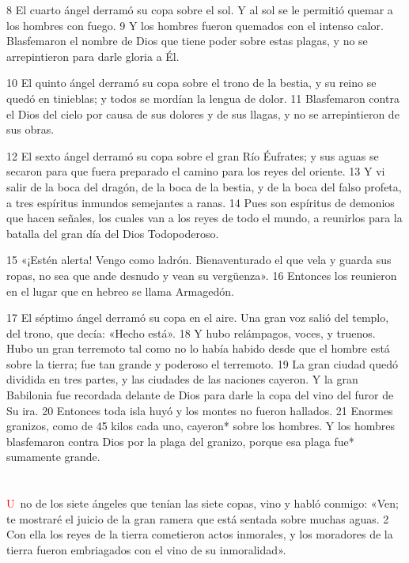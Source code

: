 \documentclass[12pt,twocolumn,twoside]{book}
\begin{document}
8 El cuarto ángel derramó su copa sobre el sol. Y al sol se le permitió quemar a los hombres con fuego. 9 Y los hombres fueron quemados con el intenso calor. Blasfemaron el nombre de Dios que tiene poder sobre estas plagas, y no se arrepintieron para darle gloria a Él.

10 El quinto ángel derramó su copa sobre el trono de la bestia, y su reino se quedó en tinieblas; y todos se mordían la lengua de dolor. 11 Blasfemaron contra el Dios del cielo por causa de sus dolores y de sus llagas, y no se arrepintieron de sus obras.

12 El sexto ángel derramó su copa sobre el gran Río Éufrates; y sus aguas se secaron para que fuera preparado el camino para los reyes del oriente. 13 Y vi salir de la boca del dragón, de la boca de la bestia, y de la boca del falso profeta, a tres espíritus inmundos semejantes a ranas. 14 Pues son espíritus de demonios que hacen señales, los cuales van a los reyes de todo el mundo, a reunirlos para la batalla del gran día del Dios Todopoderoso.

15 «¡Estén alerta! Vengo como ladrón. Bienaventurado el que vela y guarda sus ropas, no sea que ande desnudo y vean su vergüenza». 16 Entonces los reunieron en el lugar que en hebreo se llama Armagedón.

17 El séptimo ángel derramó su copa en el aire. Una gran voz salió del templo, del trono, que decía: «Hecho está». 18 Y hubo relámpagos, voces, y truenos. Hubo un gran terremoto tal como no lo había habido desde que el hombre está sobre la tierra; fue tan grande y poderoso el terremoto. 19 La gran ciudad quedó dividida en tres partes, y las ciudades de las naciones cayeron. Y la gran Babilonia fue recordada delante de Dios para darle la copa del vino del furor de Su ira. 20 Entonces toda isla huyó y los montes no fueron hallados. 21 Enormes granizos, como de 45 kilos cada uno, cayeron* sobre los hombres. Y los hombres blasfemaron contra Dios por la plaga del granizo, porque esa plaga fue* sumamente grande.
\chapter{}
\lettrine[lines=4]{\textcolor{red}{U}}{\ }no de los siete ángeles que tenían las siete copas, vino y habló conmigo: «Ven; te mostraré el juicio de la gran ramera que está sentada sobre muchas aguas. 2 Con ella los reyes de la tierra cometieron actos inmorales, y los moradores de la tierra fueron embriagados con el vino de su inmoralidad».
\end{document}
